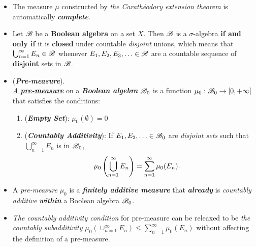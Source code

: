\documentclass[11pt]{article}
\begin{document}
\begin{itemize}
\item \begin{remark}
The measure $\mu$ constructed by \emph{the Carath\'eodory extension theorem} is automatically \emph{\textbf{complete}}.
\end{remark}

\item \begin{proposition}
Let ${\mathscr B}$ be a \textbf{Boolean algebra} on a set $X$. Then ${\mathscr B}$ is a $\sigma$-algebra \textbf{if and only if} it is \textbf{closed} under countable \emph{disjoint}
unions, which means that $\bigcup_{n=1}^{\infty} E_n \in {\mathscr B}$ whenever $E_1, E_2, E_3, \ldots \in {\mathscr B}$ are a countable sequence of \textbf{disjoint} sets in ${\mathscr B}$.
\end{proposition}

\item \begin{definition}  (\emph{\textbf{Pre-measure}}). \citep{folland2013real} \\
\underline{\emph{A \textbf{pre-measure}}} on a \emph{\textbf{Boolean algebra}} ${\mathscr B}_{0}$  is a function $\mu_0 : {\mathscr B}_0 \rightarrow [0, +\infty]$ that satisfies the conditions:
\begin{enumerate}
\item (\textbf{\emph{Empty Set}}): $\mu_0(\emptyset) = 0$
\item (\textbf{\emph{Countably Additivity}}): If $E_1, E_2, \ldots \in {\mathscr B}_0$ are \emph{disjoint sets} such that $\bigcup_{n=1}^{\infty} E_n$ is in ${\mathscr B}_0$,
 \begin{align*}
\mu_0\left(\bigcup_{n=1}^{\infty} E_n\right) &= \sum_{n=1}^{\infty} \mu_0(E_n).
\end{align*} 
\end{enumerate} 
\end{definition}

\item \begin{remark}
A \emph{pre-measure} $\mu_0$ is a \emph{\textbf{finitely additive measure}} that \emph{\textbf{already}} is \emph{countably additive} \emph{\textbf{within}} a Boolean algebra ${\mathscr B}_0$. 
\end{remark}

\item \begin{remark}
\emph{The countably additivity condition} for pre-measure can be releaxed to be \emph{the countably subadditivity} $\mu_0(\cup_{n=1}^{\infty} E_n) \le \sum_{n=1}^{\infty} \mu_0(E_n)$ without affecting the definition of a pre-measure.
\end{remark}


\end{itemize}
\end{document}
